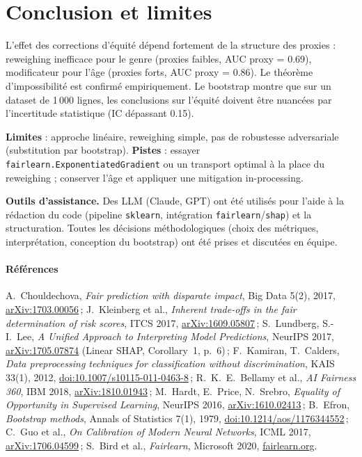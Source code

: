 \documentclass[11pt, a4paper]{article}
\begin{document}
\section*{Conclusion et limites}

L'effet des corrections d'\'equit\'e d\'epend fortement de la structure des proxies : reweighing inefficace pour le genre (proxies faibles, AUC proxy = 0.69), modificateur pour l'\^age (proxies forts, AUC proxy = 0.86). Le th\'eor\`eme d'impossibilit\'e est confirm\'e empiriquement. Le bootstrap montre que sur un dataset de 1\,000 lignes, les conclusions sur l'\'equit\'e doivent \^etre nuanc\'ees par l'incertitude statistique (IC dépassant 0.15).

\textbf{Limites} : approche lin\'eaire, reweighing simple, pas de robustesse adversariale (substitution par bootstrap). \textbf{Pistes} : essayer \texttt{fairlearn.ExponentiatedGradient} ou un transport optimal \`a la place du reweighing ; conserver l'\^age et appliquer une mitigation in-processing.

\textbf{Outils d'assistance.} Des LLM (Claude, GPT) ont \'et\'e utilis\'es pour l'aide \`a la r\'edaction du code (pipeline \texttt{sklearn}, int\'egration \texttt{fairlearn}/\texttt{shap}) et la structuration. Toutes les d\'ecisions m\'ethodologiques (choix des m\'etriques, interpr\'etation, conception du bootstrap) ont \'et\'e prises et discut\'ees en \'equipe.

\paragraph{\small Références} {\scriptsize
A.~Chouldechova, \textit{Fair prediction with disparate impact}, Big Data 5(2), 2017, \href{https://arxiv.org/abs/1703.00056}{arXiv:1703.00056}\,;
J.~Kleinberg et al., \textit{Inherent trade-offs in the fair determination of risk scores}, ITCS 2017, \href{https://arxiv.org/abs/1609.05807}{arXiv:1609.05807}\,;
S.~Lundberg, S.-I.~Lee, \textit{A Unified Approach to Interpreting Model Predictions}, NeurIPS 2017, \href{https://arxiv.org/abs/1705.07874}{arXiv:1705.07874} (Linear SHAP, Corollary~1, p.~6)\,;
F.~Kamiran, T.~Calders, \textit{Data preprocessing techniques for classification without discrimination}, KAIS 33(1), 2012, \href{https://doi.org/10.1007/s10115-011-0463-8}{doi:10.1007/s10115-011-0463-8}\,;
R.~K.~E.~Bellamy et al., \textit{AI Fairness 360}, IBM 2018, \href{https://arxiv.org/abs/1810.01943}{arXiv:1810.01943}\,;
M.~Hardt, E.~Price, N.~Srebro, \textit{Equality of Opportunity in Supervised Learning}, NeurIPS 2016, \href{https://arxiv.org/abs/1610.02413}{arXiv:1610.02413}\,;
B.~Efron, \textit{Bootstrap methods}, Annals of Statistics 7(1), 1979, \href{https://doi.org/10.1214/aos/1176344552}{doi:10.1214/aos/1176344552}\,;
C.~Guo et al., \textit{On Calibration of Modern Neural Networks}, ICML 2017, \href{https://arxiv.org/abs/1706.04599}{arXiv:1706.04599}\,;
S.~Bird et al., \textit{Fairlearn}, Microsoft 2020, \href{https://fairlearn.org/}{fairlearn.org}.
}
\end{document}
